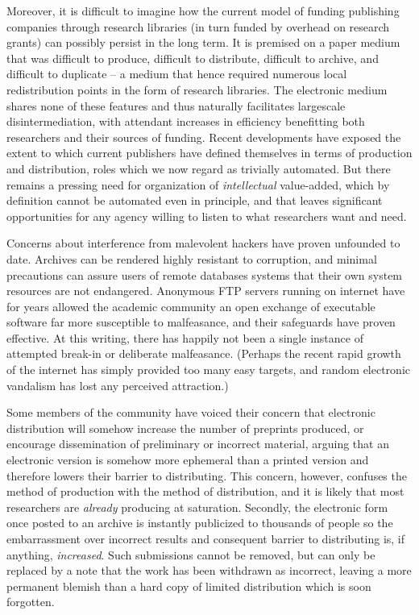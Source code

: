 Moreover, it is difficult to imagine how the current model
of funding publishing companies through research libraries (in turn funded
by overhead on research grants) can possibly persist in the long term.
It is premised on a paper medium that was difficult to produce,
difficult to distribute, difficult to archive, and difficult to duplicate --
a medium that hence required numerous local redistribution points in the
form of research libraries.
The electronic medium shares none of these features and thus naturally
facilitates largescale disintermediation, with attendant increases
in efficiency benefitting both researchers and their sources of funding.
Recent developments have exposed the extent to which
current publishers have defined themselves in terms of production and
distribution, roles which we now regard as trivially automated. But there
remains a pressing need for organization of {\it intellectual\/} value-added,
which by definition cannot be automated even in principle, and that
leaves significant opportunities for any agency willing to listen to what
researchers want and need.

Concerns about interference from malevolent hackers have proven unfounded to
date. Archives can be rendered highly resistant to corruption, and minimal
precautions can assure users of remote databases systems that their own system
resources are not endangered. Anonymous FTP servers running on internet have
for years allowed the academic community an open exchange of executable
software far more susceptible to malfeasance, and their safeguards have proven
effective. At this writing, there has happily not been a single instance of
attempted break-in or deliberate malfeasance. (Perhaps the recent rapid growth
of the internet has simply provided too many easy targets, and random
electronic vandalism has lost any perceived attraction.)

Some members of the community have voiced their concern that electronic
distribution will somehow increase the number of preprints produced, or
encourage dissemination of preliminary or incorrect material, arguing that an
electronic version is somehow more ephemeral than a printed version and
therefore lowers their barrier to distributing. This concern, however,
confuses the method of production with the method of distribution, and it is
likely that most researchers are {\it already\/} producing at saturation.
Secondly, the electronic form once posted to an archive is instantly publicized
to thousands of people so the embarrassment over incorrect results and
consequent barrier to distributing is, if anything, {\it increased\/}. Such
submissions cannot be removed, but can only be replaced by a note that the work
has been withdrawn as incorrect, leaving a more permanent blemish than a hard
copy of limited distribution which is soon forgotten.

